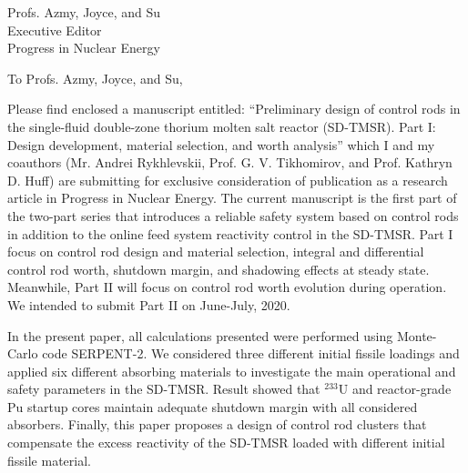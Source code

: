 \documentclass[10.75pt]{letter} %
\newcommand{\RecipientName}{Profs. Azmy, Joyce, and Su\xspace}
\newcommand{\RecipientAddress}{Executive Editor\\Progress in Nuclear Energy}
\begin{document}
	
	
	
	\begin{letter}{\RecipientName\\
			\RecipientAddress\xspace}
		
		\address{O. Ashraf\\
			oabdelaziz@mephi.ru\\
			osama.ashraf@edu.asu.edu.eg\\
			Institute of Nuc. Physics and Eng.\\
			National Research Nuclear University\\
			Moscow, Russia, 115409}
		
		
		\opening{To \RecipientName,}
		
		Please find enclosed a manuscript entitled: ``Preliminary design of control rods in the single-fluid double-zone thorium molten salt reactor (SD-TMSR). Part I: Design development, material selection, and worth analysis'' which I and my coauthors (Mr. Andrei Rykhlevskii, Prof. G. V. Tikhomirov, and Prof. Kathryn D. Huff) are submitting for exclusive consideration of publication as a research article in Progress in Nuclear Energy. The current manuscript is the first part of the two-part series that introduces a reliable safety system based on control rods in addition to the online feed system reactivity control in the SD-TMSR. Part I focus on control rod design and material selection, integral and differential control rod worth, shutdown margin, and shadowing effects at steady state. Meanwhile, Part II will focus on control rod worth evolution during operation. We intended to submit Part II on June-July, 2020.
		
		In the present paper, all calculations presented were performed using Monte-Carlo code SERPENT-2. We considered three different initial fissile loadings and applied six different absorbing materials to investigate the main operational and safety parameters in the SD-TMSR. Result showed that $^{233}$U and reactor-grade Pu startup cores maintain adequate shutdown margin with all considered absorbers. Finally, this paper proposes a design of control rod clusters that compensate the excess reactivity of the SD-TMSR loaded with different initial fissile material.
		

\end{letter}
\end{document}
